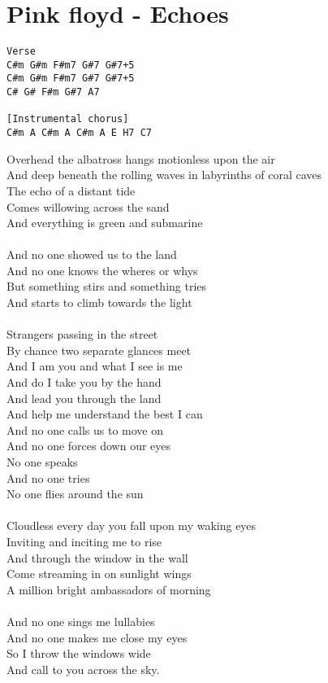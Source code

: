 \section{Pink floyd - Echoes}
\begin{verbatim}
Verse
C#m G#m F#m7 G#7 G#7+5 
C#m G#m F#m7 G#7 G#7+5 
C# G# F#m G#7 A7

[Instrumental chorus]
C#m A C#m A C#m A E H7 C7
\end{verbatim}
Overhead the albatross hangs motionless upon the air\\
And deep beneath the rolling waves in labyrinths of coral caves\\
The echo of a distant tide\\
Comes willowing across the sand\\
And everything is green and submarine\\
\\
And no one showed us to the land\\
And no one knows the wheres or whys\\
But something stirs and something tries\\
And starts to climb towards the light\\
\\
Strangers passing in the street\\
By chance two separate glances meet\\
And I am you and what I see is me\\
And do I take you by the hand\\
And lead you through the land\\
And help me understand the best I can\\
And no one calls us to move on\\
And no one forces down our eyes\\
No one speaks\\
And no one tries\\
No one flies around the sun\\
\\
Cloudless every day you fall upon my waking eyes\\
Inviting and inciting me to rise\\
And through the window in the wall\\
Come streaming in on sunlight wings\\
A million bright ambassadors of morning\\
\\
And no one sings me lullabies\\
And no one makes me close my eyes\\
So I throw the windows wide\\
And call to you across the sky.\\
\newpage


